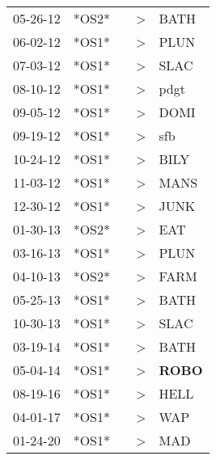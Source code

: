 \begin{supertabular}{p{0.07\textwidth}p{0.06\textwidth}p{0.02\textwidth}p{0.02\textwidth}p{0.06\textwidth}}
 05-26-12\textsuperscript{} &  *OS2* &   &  \textgreater &           BATH\textsuperscript{} \\
 06-02-12\textsuperscript{} &  *OS1* &   &  \textgreater &           PLUN\textsuperscript{} \\
 07-03-12\textsuperscript{} &  *OS1* &   &  \textgreater &           SLAC\textsuperscript{} \\
 08-10-12\textsuperscript{} &  *OS1* &   &  \textgreater &           pdgt\textsuperscript{} \\
 09-05-12\textsuperscript{} &  *OS1* &   &  \textgreater &           DOMI\textsuperscript{} \\
 09-19-12\textsuperscript{} &  *OS1* &   &  \textgreater &            sfb\textsuperscript{} \\
 10-24-12\textsuperscript{} &  *OS1* &   &  \textgreater &           BILY\textsuperscript{} \\
 11-03-12\textsuperscript{} &  *OS1* &   &  \textgreater &           MANS\textsuperscript{} \\
 12-30-12\textsuperscript{} &  *OS1* &   &  \textgreater &           JUNK\textsuperscript{} \\
 01-30-13\textsuperscript{} &  *OS2* &   &  \textgreater &            EAT\textsuperscript{} \\
 03-16-13\textsuperscript{} &  *OS1* &   &  \textgreater &           PLUN\textsuperscript{} \\
 04-10-13\textsuperscript{} &  *OS2* &   &  \textgreater &           FARM\textsuperscript{} \\
 05-25-13\textsuperscript{} &  *OS1* &   &  \textgreater &           BATH\textsuperscript{} \\
 10-30-13\textsuperscript{} &  *OS1* &   &  \textgreater &           SLAC\textsuperscript{} \\
 03-19-14\textsuperscript{} &  *OS1* &   &  \textgreater &           BATH\textsuperscript{} \\
 05-04-14\textsuperscript{} &  *OS1* &   &  \textgreater &  \textbf{ROBO\textsuperscript{}} \\
 08-19-16\textsuperscript{} &  *OS1* &   &  \textgreater &           HELL\textsuperscript{} \\
 04-01-17\textsuperscript{} &  *OS1* &   &  \textgreater &            WAP\textsuperscript{} \\
 01-24-20\textsuperscript{} &  *OS1* &   &  \textgreater &            MAD\textsuperscript{} \\
\end{supertabular}

